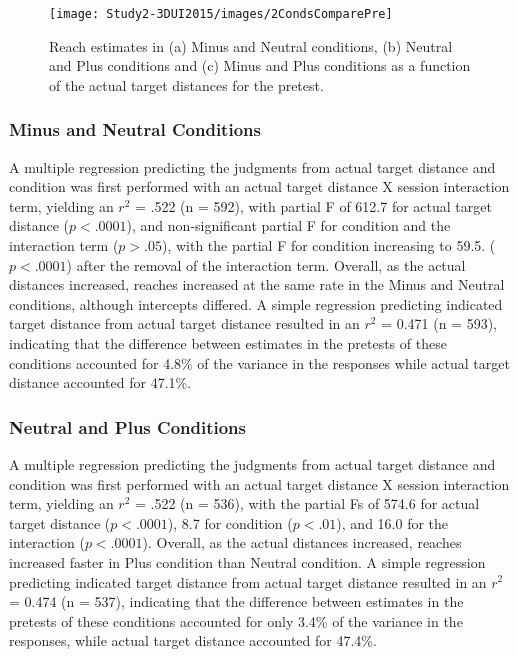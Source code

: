 \begin{figure*}[ht]
	\centering
	\texttt{[image: Study2-3DUI2015/images/2CondsComparePre]}
	\vspace{-1em}
	\caption{Reach estimates in (a) Minus and Neutral conditions, (b) Neutral and Plus conditions and (c) Minus and Plus conditions as a function of the actual target distances for the pretest.}
	\label{fig:Pre}
\end{figure*}

\subsubsection{Minus and Neutral Conditions}
A multiple regression predicting the judgments from actual target distance and condition was first performed with an actual target distance X session interaction term, yielding an $r^2$ = .522 (n = 592), with partial F of 612.7 for actual target distance ($p < .0001$), and non-significant partial F for condition and the interaction term ($p > .05$), with the partial F for condition increasing to 59.5. ($p < .0001$) after the removal of the interaction term. Overall, as the actual distances increased, reaches increased at the same rate in the Minus and Neutral conditions, although intercepts differed. A simple regression predicting indicated target distance from actual target distance resulted in an $r^2$ = 0.471 (n = 593), indicating that the difference between estimates in the pretests of these conditions accounted for 4.8\% of the variance in the responses while actual target distance accounted for 47.1\%.

\subsubsection{Neutral and Plus Conditions}
A multiple regression predicting the judgments from actual target distance and condition was first performed with an actual target distance X session interaction term, yielding an $r^2$ = .522 (n = 536), with the partial Fs of 574.6 for actual target distance ($p < .0001$), 8.7 for condition ($p < .01$), and 16.0 for the interaction ($p < .0001$). Overall, as the actual distances increased, reaches increased faster in Plus condition than Neutral condition. A simple regression predicting indicated target distance from actual target distance resulted in an $r^2$ = 0.474 (n = 537), indicating that the difference between estimates in the pretests of these conditions accounted for only 3.4\% of the variance in the responses, while actual target distance accounted for 47.4\%.


